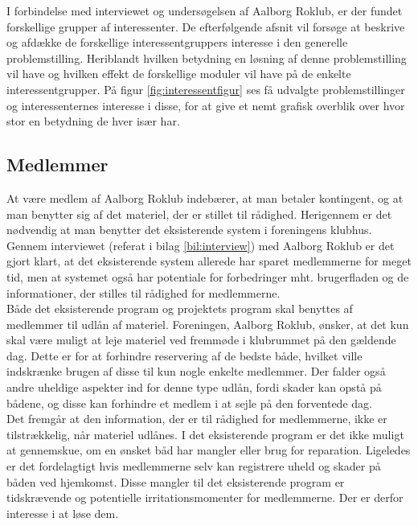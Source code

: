 \label{sec:interessentanalyse}
I forbindelse med interviewet og undersøgelsen af Aalborg Roklub, er der fundet forskellige grupper af interessenter. De efterfølgende afsnit vil forsøge at beskrive og afdække de forskellige interessentgruppers interesse i den generelle problemstilling. Heriblandt hvilken betydning en løsning af denne problemstilling vil have og hvilken effekt de forskellige moduler vil have på de enkelte interessentgrupper. På figur \ref{fig:interessentfigur} ses få udvalgte problemstillinger og interessenternes interesse i disse, for at give et nemt grafisk overblik over hvor stor en betydning de hver især har.


\subsection*{Medlemmer}

At være medlem af Aalborg Roklub indebærer, at man betaler kontingent, og at man benytter sig af det materiel, der er stillet til rådighed. Herigennem er det nødvendig at man benytter det eksisterende system i foreningens klubhus. Gennem interviewet (referat i bilag \ref{bil:interview}) med Aalborg Roklub er det gjort klart, at det eksisterende system allerede har sparet medlemmerne for meget tid, men at systemet også har potentiale for forbedringer mht. brugerfladen og de informationer, der stilles til rådighed for medlemmerne.\\

Både det eksisterende program og projektets program skal benyttes af medlemmer til udlån af materiel. Foreningen, Aalborg Roklub, ønsker, at det kun skal være muligt at leje materiel ved fremmøde i klubrummet på den gældende dag. Dette er for at forhindre reservering af de bedste både, hvilket ville indskrænke brugen af disse til kun nogle enkelte medlemmer. Der falder også andre uheldige aspekter ind for denne type udlån, fordi skader kan opstå på bådene, og disse kan forhindre et medlem i at sejle på den forventede dag.\\

Det fremgår at den information, der er til rådighed for medlemmerne, ikke er tilstrækkelig, når materiel udlånes. I det eksisterende program er det ikke muligt at gennemskue, om en ønsket båd har mangler eller brug for reparation. Ligeledes er det fordelagtigt hvis medlemmerne selv kan registrere uheld og skader på båden ved hjemkomst. Disse mangler til det eksisterende program er tidskrævende og potentielle irritationsmomenter for medlemmerne. Der er derfor interesse i at løse dem.\\

